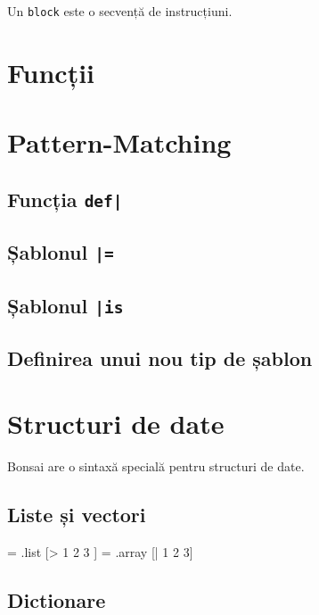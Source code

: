 \documentclass[12pt,a4paper]{memoir}
\begin{document}
Un \texttt{block} este o secvență de instrucțiuni.


\section{Funcții}


\section{Pattern-Matching}

\subsection{Funcția \texttt{def|}}

\subsection{Șablonul \texttt{|=}}

\subsection{Șablonul \texttt{|is}}


\subsection{Definirea unui nou tip de șablon}

\section{Structuri de date}

Bonsai are o sintaxă specială pentru structuri de date.

\subsection{Liste și vectori}

\begin{code}
= .list [> 1 2 3 ]
= .array [| 1 2 3]
\end{code}

\subsection{Dictionare}
\end{document}
